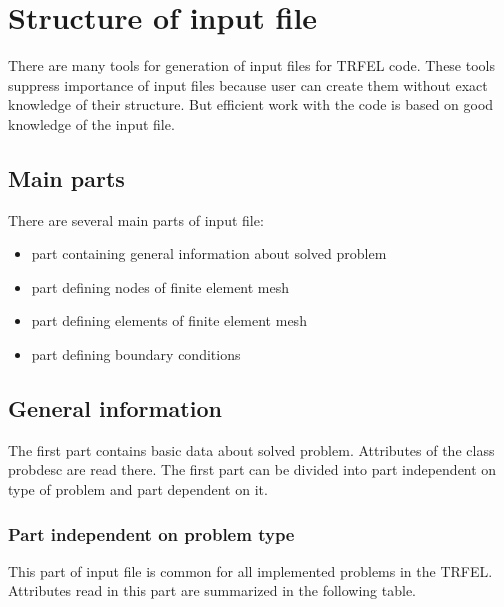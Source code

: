 \chapter{Structure of input file}

There are many tools for generation of input files for TRFEL code. These tools
suppress importance of input files because user can create them without exact
knowledge of their structure. But efficient work with the code is based on
good knowledge of the input file.

\section{Main parts}

There are several main parts of input file:

\begin{itemize}
\item{part containing general information about solved problem}
\item{part defining nodes of finite element mesh}
\item{part defining elements of finite element mesh}
\item{part defining boundary conditions}
\end{itemize}

\section{General information}

The first part contains basic data about solved problem. Attributes of the class {\sf probdesc}
are read there. The first part can be divided into part independent on type of problem and part
dependent on it.

\subsection{Part independent on problem type}

This part of input file is common for all implemented problems in the TRFEL. Attributes read
in this part are summarized in the following table.

